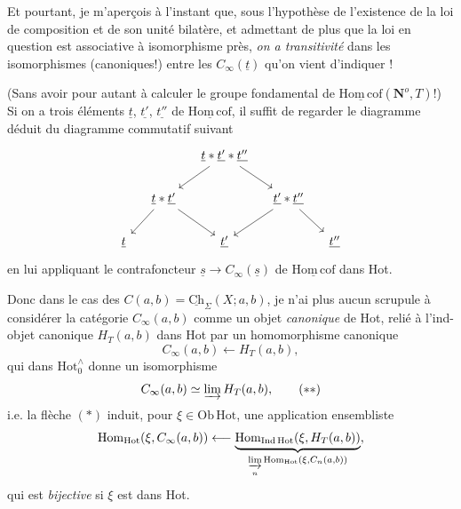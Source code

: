 \documentclass[11pt]{article}
\newcommand{\msp}[1]{\marginpar{\footnotesize [#1]}}
\newcommand{\Hot}{\mathrm{Hot}}
\newcommand{\Hotz}{\mathrm{Hot}_0^{\wedge}}
\newcommand{\Hc}{\underline{\mathrm{Hom\,cof}}}
\newcommand{\Nop}{\mathbf{N}^o}
\begin{document}
Et pourtant, je m'aperçois à l'instant que, sous l'hypothèse de l'existence de la loi de composition et de son unité bilatère, et admettant de plus que la loi en question est associative à isomorphisme près, \textit{on a transitivité} dans les isomorphismes (canoniques!) entre les $C_\infty(\underline{t})$ qu'on vient d'indiquer !

\msp{page 120}
(Sans avoir pour autant à calculer le groupe fondamental de $\Hc(\Nop, T)$!) Si on a trois éléments $\underline{t}$, $\underline{t'}$, $\underline{t''}$ de $\Hc$, il suffit de regarder le diagramme déduit du diagramme commutatif suivant
\[
\begin{tikzcd}[column sep=small]
 & & \underline{t} * \underline{t'} * \underline{t''} \arrow[ld] \arrow[rd] & & \\
 & \underline{t} * \underline{t'} \arrow[ld] \arrow[rd] & & \underline{t'} * \underline{t''} \arrow[ld] \arrow[rd] & \\
\underline{t} & & \underline{t'} & & \underline{t''}
\end{tikzcd}
\]
en lui appliquant le contrafoncteur $\underline{s} \longrightarrow C_\infty(\underline{s})$ de $\Hc$ dans Hot.

Donc dans le cas des $C(a,b) = \underline{\mathrm{Ch}}_\Sigma(X; a, b)$, je n'ai plus aucun scrupule à considérer la catégorie $C_\infty(a,b)$ comme un objet \textit{canonique} de Hot, relié à l'ind-objet canonique $H_T(a,b)$ dans Hot par un homomorphisme canonique
\[
C_\infty(a,b) \longleftarrow H_T(a,b), \tag*{$(*)$}
\]
qui dans $\Hotz$ donne un isomorphisme
\[
C_\infty(a,b) \simeq \varinjlim H_T(a,b), \tag*{$(**)$}
\]
i.e. la flèche $(*)$ induit, pour $\xi \in \mathrm{Ob}\,\Hot$, une application ensembliste
\[
\mathrm{Hom}_{\Hot}(\xi, C_\infty(a,b)) \longleftarrow \underbrace{\mathrm{Hom}_{\mathrm{Ind}\,\Hot}(\xi, H_T(a,b))}_{\underset{n}{\varinjlim}\, \mathrm{Hom}_{\Hot}(\xi, C_n(a,b))},
\]
qui est \textit{bijective} si $\xi$ est dans Hot.
\end{document}

